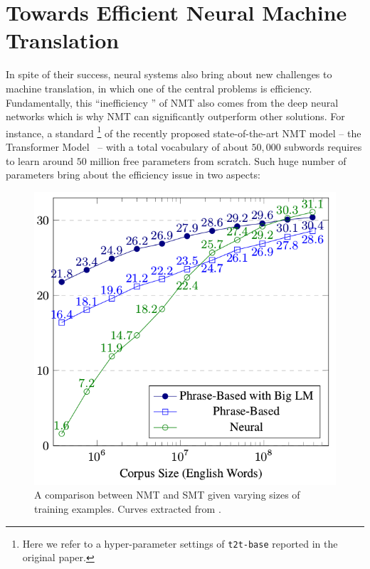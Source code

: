 

\section{Towards Efficient Neural Machine Translation}

In spite of their success, neural systems also bring about new challenges to machine translation, in which one of the central problems is efficiency. Fundamentally, this ``inefficiency '' of NMT also comes from the deep neural networks which is why  NMT can significantly outperform other solutions. For instance, a standard \footnote{Here we refer to a hyper-parameter settings of  \texttt{t2t-base} reported in the original paper.} of the recently proposed state-of-the-art NMT model  -- the Transformer Model~\cite{vaswani2017attention} -- with a total vocabulary of about $50,000$ subwords requires to learn around $50$ million free parameters from scratch. 
Such huge number of parameters bring about the efficiency issue in two aspects:
\begin{figure}[hptb]
\centering
\includegraphics[width=0.6\linewidth]{figs/intro/corpus_size.png}
\caption{\label{cp1.fig.corpus_size} A comparison between NMT and SMT given varying sizes of training examples. Curves extracted from .}
\end{figure}
